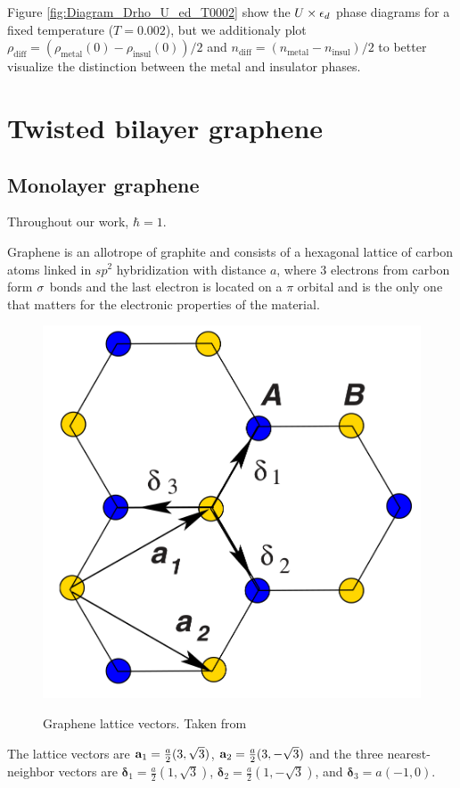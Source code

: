 \documentclass[12pt]{report}
\begin{document}
Figure \ref{fig:Diagram_Drho_U_ed_T0002} show the $U \times \epsilon_d$ phase diagrams for a fixed temperature ($T = 0.002$), but we additionaly plot $\rho_{\text{diff}} = (\rho_{\text{metal}}(0) - \rho_{\text{insul}}(0))/2$ and $n_{\text{diff}} = (n_{\text{metal}} - n_{\text{insul}})/2$ to better visualize the distinction between the metal and insulator phases.




\section{Twisted bilayer graphene} \label{sec:tbg}

\subsection{Monolayer graphene} \label{sec:monolayer}

Throughout our work, $\hbar = 1$.

Graphene is an allotrope of graphite and consists of a hexagonal lattice of carbon atoms linked in $sp^2$ hybridization with distance $a$, where $3$ electrons from carbon form ${\sigma}$ bonds and the last electron is located on a $\pi$ orbital and is the only one that matters for the electronic properties of the material.

\begin{figure}[H]
\centering
\includegraphics[width=0.3\linewidth]{fig/tbg/graphene-lattice_vectors.png}
\label{fig:graphene-lattice_vectors}
\caption{Graphene lattice vectors. Taken from \cite{geim2009}}
\end{figure}

The lattice vectors are $\vb{a}_1 = \frac{a}{2} (3, \sqrt{3})$, $\vb{a}_2 = \frac{a}{2} (3, -\sqrt{3})$ and the three nearest-neighbor vectors are $\bm{\delta}_1 = \frac{a}{2} (1, \sqrt{3})$, $\bm{\delta}_2 = \frac{a}{2} (1, -\sqrt{3})$, and $\bm{\delta}_3 = a (-1, 0)$.
\end{document}
